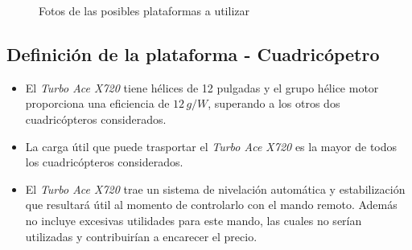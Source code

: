 \documentclass[main]{subfiles}
\begin{document}
\begin{figure} [h!]
  \centering
  \caption{Fotos de las posibles plataformas a utilizar}
  \label{fig:cuadricopteros}
\end{figure}

\subsection{Definici\'on de la plataforma - Cuadric\'opetro}

\begin{itemize}
	\item El \emph{Turbo Ace X720} tiene h\'elices de 12 pulgadas y el grupo h\'elice motor proporciona una eficiencia de $12\,g/W$, superando a los otros dos cuadric\'opteros considerados.
	\item La carga \'util que puede trasportar el \emph{Turbo Ace X720} es la mayor de todos los cuadric\'opteros considerados.
	\item El \emph{Turbo Ace X720} trae un sistema de nivelaci\'on autom\'atica y estabilizaci\'on que resultar\'a \'util al momento de controlarlo con el mando remoto. Adem\'as no incluye excesivas utilidades para este mando, las cuales no ser\'ian utilizadas y contribuir\'ian a encarecer el precio.
\end{itemize}
\end{document}
